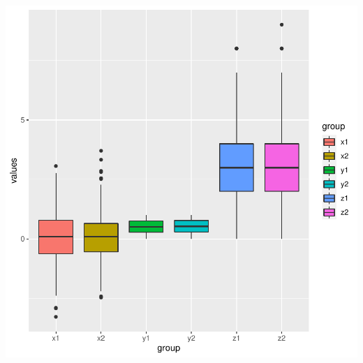 \documentclass{article}\usepackage[]{graphicx}\usepackage[]{xcolor}
\makeatletter
\def\maxwidth{ %
  \ifdim\Gin@nat@width>\linewidth
    \linewidth
  \else
    \Gin@nat@width
  \fi
}
\newenvironment{knitrout}{}{} %
\makeatother
\begin{document}
\begin{knitrout}
{\centering \includegraphics[width=\maxwidth]{figure/unnamed-chunk-1-9} 

}


\end{knitrout}
\end{document}
